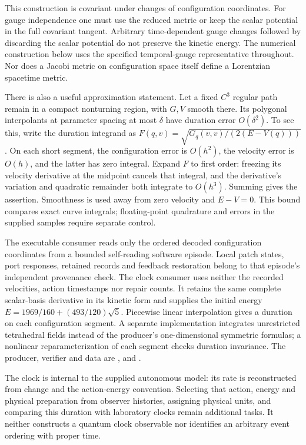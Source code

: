 This construction is covariant under changes of configuration coordinates.
For gauge independence one must use the reduced metric or keep the scalar
potential in the full covariant tangent. Arbitrary time-dependent gauge
changes followed by discarding the scalar potential do not preserve the
kinetic energy. The numerical construction below uses the specified
temporal-gauge representative throughout. Nor does a Jacobi metric on
configuration space itself define a Lorentzian spacetime metric.

There is also a useful approximation statement. Let a fixed \(C^3\)
regular path remain in a compact nonturning region, with \(G,V\) smooth
there. Its polygonal interpolants at parameter spacing at most \(\delta\)
have duration error \(O(\delta^2)\). To see this, write the duration
integrand as \(F(q,v)=\sqrt{G_q(v,v)/(2(E-V(q)))}\). On each short
segment, the configuration error is \(O(h^2)\), the velocity error is
\(O(h)\), and the latter has zero integral. Expand \(F\) to first
order: freezing its velocity derivative at the midpoint cancels that
integral, and the derivative's variation and quadratic remainder both
integrate to \(O(h^3)\). Summing gives the assertion. Smoothness is used
away from zero velocity and \(E-V=0\). This bound compares exact curve
integrals; floating-point quadrature and errors in the supplied samples
require separate control.

The executable consumer reads only the ordered decoded configuration
coordinates from a bounded self-reading software episode. Local patch
states, port responses, retained records and feedback restoration belong
to that episode's independent provenance check. The clock consumer uses
neither the recorded velocities, action timestamps nor repair counts.
It retains the same complete scalar-basis derivative in its kinetic form
and supplies the initial energy
\(E=1969/160+(493/120)\sqrt5\). Piecewise linear interpolation gives
a duration on each configuration segment. A separate implementation
integrates unrestricted tetrahedral fields instead of the producer's
one-dimensional symmetric formulas; a nonlinear reparameterization of
each segment checks duration invariance. The producer, verifier and
data are ,
 and
.

The clock is internal to the supplied autonomous model: its rate is
reconstructed from change and the action-energy convention. Selecting that
action, energy and physical preparation from observer histories, assigning
physical units, and comparing this duration with laboratory clocks remain
additional tasks. It neither constructs a quantum clock observable nor
identifies an arbitrary event ordering with proper time.
